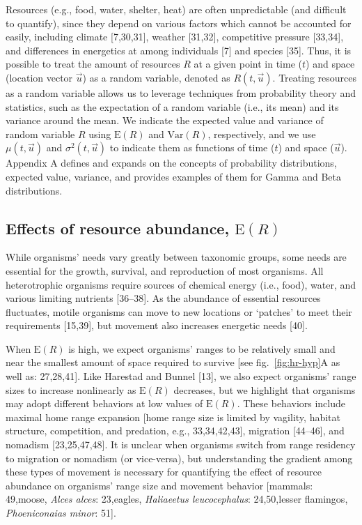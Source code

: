 \documentclass[
  12pt,
]{article}
\begin{document}
\noindent Resources (e.g., food, water, shelter, heat) are often unpredictable (and difficult to quantify), since they depend on various factors which cannot be accounted for easily, including climate {[}7,30,31{]}, weather {[}31,32{]}, competitive pressure {[}33,34{]}, and differences in energetics at among individuals {[}7{]} and species {[}35{]}. Thus, it is possible to treat the amount of resources \(R\) at a given point in time (\(t\)) and space (location vector \(\vec u\)) as a random variable, denoted as \(R(t, \vec u)\). Treating resources as a random variable allows us to leverage techniques from probability theory and statistics, such as the expectation of a random variable (i.e., its mean) and its variance around the mean. We indicate the expected value and variance of random variable \(R\) using \(\text{E}(R)\) and \(\text{Var}(R)\), respectively, and we use \(\mu(t, \vec u)\) and \(\sigma^2(t, \vec u)\) to indicate them as functions of time (\(t\)) and space (\(\vec u\)). Appendix A defines and expands on the concepts of probability distributions, expected value, variance, and provides examples of them for Gamma and Beta distributions.

\subsection{\texorpdfstring{Effects of resource abundance, \(\text{E}(R)\)}{Effects of resource abundance, \textbackslash text\{E\}(R)}}\label{effects-of-resource-abundance-texter}

\noindent While organisms' needs vary greatly between taxonomic groups, some needs are essential for the growth, survival, and reproduction of most organisms. All heterotrophic organisms require sources of chemical energy (i.e., food), water, and various limiting nutrients {[}36--38{]}. As the abundance of essential resources fluctuates, motile organisms can move to new locations or `patches' to meet their requirements {[}15,39{]}, but movement also increases energetic needs {[}40{]}.

When \(\text{E}(R)\) is high, we expect organisms' ranges to be relatively small and near the smallest amount of space required to survive {[}see fig.~\ref{fig:hr-hyp}A as well as: 27,28,41{]}. Like Harestad and Bunnel {[}13{]}, we also expect organisms' range sizes to increase nonlinearly as \(\text{E}(R)\) decreases, but we highlight that organisms may adopt different behaviors at low values of \(\text{E}(R)\). These behaviors include maximal home range expansion {[}home range size is limited by vagility, habitat structure, competition, and predation, e.g., 33,34,42,43{]}, migration {[}44--46{]}, and nomadism {[}23,25,47,48{]}. It is unclear when organisms switch from range residency to migration or nomadism (or vice-versa), but understanding the gradient among these types of movement is necessary for quantifying the effect of resource abundance on organisms' range size and movement behavior {[}mammals: 49,moose, \emph{Alces alces}: 23,eagles, \emph{Haliaeetus leucocephalus}: 24,50,lesser flamingos, \emph{Phoeniconaias minor}: 51{]}.
\end{document}
